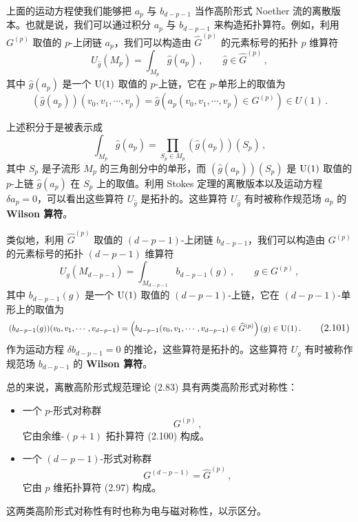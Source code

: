  上面的运动方程使我们能够把 $a_p$ 与 $b_{d-p-1}$ 当作高阶形式 Noether 流的离散版本。也就是说，我们可以通过积分 $a_p$ 与 $b_{d-p-1}$ 来构造拓扑算符。例如，利用 $G^{(p)}$ 取值的 $p$-上闭链 $a_p$，我们可以构造由 $\widehat{G}^{(p)}$ 的元素标号的拓扑 $p$ 维算符
\begin{equation}
  U_{\hat{g}}(M_p) = \int_{M_p}\hat{g}(a_p)\,,\qquad \hat{g}\in\widehat{G}^{(p)}\,, \tag{2.97}
\end{equation}
其中 $\hat{g}(a_p)$ 是一个 $\mathrm{U}(1)$ 取值的 $p$-上链，它在 $p$-单形上的取值为
\begin{equation}
  (\hat{g}(a_p))(v_0,v_1,\cdots,v_p) = \hat{g}\left(a_p(v_0,v_1,\cdots,v_p)\in G^{(p)}\right)\in U(1)\,. \tag{2.98}
\end{equation}

上述积分于是被表示成
\begin{equation}
  \int_{M_p}\hat{g}(a_p) = \prod_{S_p\in M_p}(\hat{g}(a_p))(S_p)\,, \tag{2.99}
\end{equation}
其中 $S_p$ 是子流形 $M_p$ 的三角剖分中的单形，而 $(\hat{g}(a_p))(S_p)$ 是 $\mathrm{U}(1)$ 取值的 $p$-上链 $\hat{g}(a_p)$ 在 $S_p$ 上的取值。利用 Stokes 定理的离散版本以及运动方程 $\delta a_p=0$，可以看出这些算符 $U_{\hat{g}}$ 是拓扑的。这些算符 $U_{\hat{g}}$ 有时被称作规范场 $a_p$ 的 \textbf{Wilson 算符}。

类似地，利用 $\widehat{G}^{(p)}$ 取值的 $(d-p-1)$-上闭链 $b_{d-p-1}$，我们可以构造由 $G^{(p)}$ 的元素标号的拓扑 $(d-p-1)$ 维算符
\begin{equation}
  U_g(M_{d-p-1}) = \int_{M_{d-p-1}} b_{d-p-1}(g)\,,\qquad g\in G^{(p)}\,, \tag{2.100}
\end{equation}
其中 $b_{d-p-1}(g)$ 是一个 $\mathrm{U}(1)$ 取值的 $(d-p-1)$-上链，它在 $(d-p-1)$-单形上的取值为
\begin{equation}
  \resizebox{0.88\textwidth}{!}{$\displaystyle (b_{d-p-1}(g))(v_0,v_1,\cdots,v_{d-p-1}) = \left(b_{d-p-1}(v_0,v_1,\cdots,v_{d-p-1})\in\widehat{G}^{(p)}\right)(g)\in \U(1)\,.$} \tag{2.101}
\end{equation}
作为运动方程 $\delta b_{d-p-1}=0$ 的推论，这些算符是拓扑的。这些算符 $U_g$ 有时被称作规范场 $b_{d-p-1}$ 的 \textbf{Wilson 算符}。

总的来说，离散高阶形式规范理论 (2.83) 具有两类高阶形式对称性：
\begin{itemize}[leftmargin=1.4em,itemsep=1pt,topsep=1pt]
\item 一个 $p$-形式对称群
\begin{equation}
  G^{(p)}\,, \tag{2.102}
\end{equation}
它由余维-$(p+1)$ 拓扑算符 (2.100) 构成。
\item 一个 $(d-p-1)$-形式对称群
\begin{equation}
  G^{(d-p-1)} = \widehat{G}^{(p)}\,, \tag{2.103}
\end{equation}
它由 $p$ 维拓扑算符 (2.97) 构成。
\end{itemize}
这两类高阶形式对称性有时也称为电与磁对称性，以示区分。

